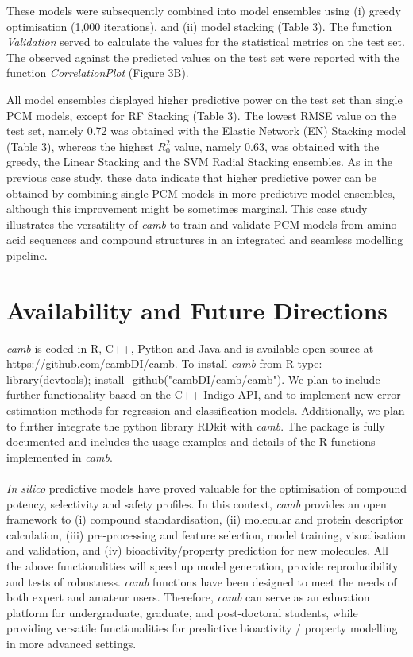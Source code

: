 \documentclass[twoside,a4wide,10pt]{article}
\begin{document}
These models were subsequently combined into model ensembles using
(i) greedy optimisation (1,000 iterations), and (ii) model stacking (Table 3).
The function {\it Validation} served to calculate the values for the statistical metrics on the test set.
The observed against the predicted values on the test set 
were reported with the function {\it CorrelationPlot} (Figure 3B).

All model ensembles displayed higher predictive power on the test set
than single PCM models, except for RF Stacking (Table 3).
The lowest RMSE value on the test set, namely 0.72 was obtained 
with the Elastic Network (EN) Stacking model (Table 3),
whereas the highest $R^{2}_{0}$ value, namely 0.63,
was obtained with the greedy, the Linear Stacking and the SVM Radial Stacking ensembles.
As in the previous case study,
these data indicate that higher predictive power can be obtained by combining 
single PCM models in more predictive model ensembles,
although this improvement might be sometimes marginal.
This case study illustrates the versatility of {\it camb} to train and validate
PCM models from amino acid sequences and compound structures
in an integrated and seamless modelling pipeline.

\section*{Availability and Future Directions}

{\it camb} is coded in R, C++, Python and Java and is available open source
at https://github.com/cambDI/camb.
To install {\it camb} from R type: library(devtools); install_github("cambDI/camb/camb").
We plan to include further functionality based on the C++ Indigo API,
and to implement new error estimation methods for regression and classification models.
Additionally, we plan to further integrate the python library RDkit with {\it camb}.
The package is fully documented and includes the usage examples and details of the R functions implemented in {\it camb}.\\
\\
{\it In silico} predictive models have proved valuable
for the optimisation of compound potency, selectivity and safety profiles.
In this context, {\it camb} provides an open framework
to (i) compound standardisation, (ii) molecular and protein descriptor calculation,
(iii) pre-processing and feature selection, model training, visualisation and validation, and 
(iv) bioactivity/property prediction for new molecules.
All the above functionalities will speed up model generation, provide reproducibility and tests of robustness.
{\it camb} functions have been designed to meet the needs of both expert and amateur users. 
Therefore, {\it camb} can serve as an education platform for 
undergraduate, graduate, and post-doctoral students,
while providing versatile functionalities for predictive bioactivity / property modelling
in more advanced settings.
\end{document}
